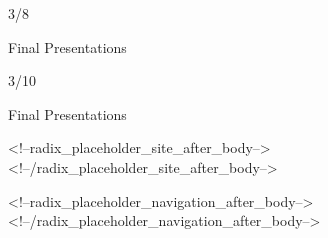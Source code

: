 \documentclass[
]{article}
\begin{document}
3/8

Final Presentations

3/10

Final Presentations

<!--radix_placeholder_site_after_body-->
<!--/radix_placeholder_site_after_body-->

<!--radix_placeholder_navigation_after_body-->
<!--/radix_placeholder_navigation_after_body-->
\end{document}
